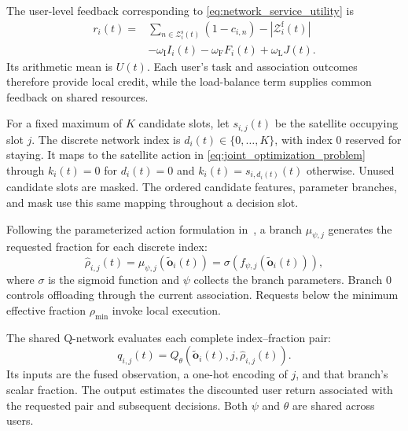 The user-level feedback corresponding to
\eqref{eq:network_service_utility} is
\begin{equation}
\begin{aligned}
r_i(t)
={}&
\sum_{n\in\mathcal{Z}_i^{\mathrm{s}}(t)}
(1-c_{i,n})
-|\mathcal{Z}_i^{\mathrm{f}}(t)|\\
&-\omega_{\mathrm I}I_i(t)
-\omega_{\mathrm F}F_i(t)
+\omega_{\mathrm L}J(t).
\end{aligned}
\label{eq:pdqn_user_reward}
\end{equation}
Its arithmetic mean is $U(t)$.
Each user's task and association outcomes therefore provide
local credit, while the load-balance term supplies common
feedback on shared resources.

For a fixed maximum of $K$ candidate slots, let
$s_{i,j}(t)$ be the satellite occupying slot $j$.
The discrete network index is
$d_i(t)\in\{0,\ldots,K\}$, with index $0$ reserved for staying.
It maps to the satellite action in
\eqref{eq:joint_optimization_problem} through
$k_i(t)=0$ for $d_i(t)=0$ and
$k_i(t)=s_{i,d_i(t)}(t)$ otherwise.
Unused candidate slots are masked. The ordered candidate
features, parameter branches, and mask use this same mapping
throughout a decision slot.

Following the parameterized action formulation
in~\cite{xiong2018pdqn}, a branch $\mu_{\psi,j}$ generates
the requested fraction for each discrete index:
\begin{equation}
\widehat{\rho}_{i,j}(t)
=
\mu_{\psi,j}\left(\widetilde{\mathbf{o}}_i(t)\right)
=
\sigma\left(
f_{\psi,j}\left(\widetilde{\mathbf{o}}_i(t)\right)
\right),
\label{eq:pdqn_parameter_generation}
\end{equation}
where $\sigma$ is the sigmoid function and $\psi$ collects
the branch parameters. Branch $0$ controls offloading
through the current association. Requests below the
minimum effective fraction $\rho_{\min}$ invoke local
execution.

The shared Q-network evaluates each complete
index--fraction pair:
\begin{equation}
q_{i,j}(t)
=
Q_\theta\left(
\widetilde{\mathbf{o}}_i(t),j,
\widehat{\rho}_{i,j}(t)
\right).
\label{eq:pdqn_pair_value}
\end{equation}
Its inputs are the fused observation, a one-hot encoding
of $j$, and that branch's scalar fraction.
The output estimates the discounted user return associated
with the requested pair and subsequent decisions.
Both $\psi$ and $\theta$ are shared across users.


